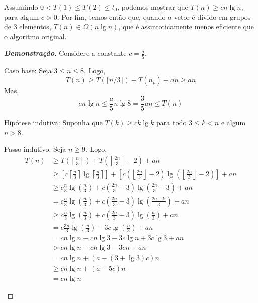 Assumindo $0 < T(1) \leq T(2) \leq t_0$, podemos mostrar que $T(n) \geq c n \lg n$, para algum $c > 0$. Por fim, temos então que, quando o vetor é divido em grupos de 3 elementos, $T(n) \in \Omega(n \lg n)$, que é assintoticamente menos eficiente que o algoritmo original.

\itemdsep{}

\begin{proof}[\textbf{Demonstração}]
    Considere a constante $c = \frac{a}{5}$.

    \begin{ncasos}
        \item[Caso base:] Seja $3 \leq n \leq 8$. Logo,
        \[
            T(n) \geq T(\lceil n / 3 \rceil) + T(n_p) + a n \geq a n
        \]
        Mas,
        \[
            c n \lg n \leq \frac{a}{5} n \lg 8 = \frac{3}{5} a n \leq T(n)
        \]

        \item[Hipótese indutiva:] Suponha que $T(k) \geq c k \lg k$ para todo $3 \leq k < n$ e algum $n > 8$.

        \item[Passo indutivo:] Seja $n \geq 9$. Logo,
        \begin{align*}
            T(n)
            &\geq T\left(\left\lceil \frac{n}{3} \right\rceil\right) + T\left(\left\lfloor\frac{2n}{3}\right\rfloor - 2\right) + a n \\
            &\geq \left[ c \left\lceil \frac{n}{3} \right\rceil \lg\left\lceil \frac{n}{3} \right\rceil \right] + \left[ c \left(\left\lfloor\frac{2n}{3}\right\rfloor - 2\right) \lg\left(\left\lfloor\frac{2n}{3}\right\rfloor - 2 \right) \right] + a n \\
            &\geq c \frac{n}{3} \lg\left(\frac{n}{3}\right) + c \left(\frac{2n}{3} - 3\right) \lg\left(\frac{2n}{3} - 3 \right) + a n \\
            &= c \frac{n}{3} \lg\left(\frac{n}{3}\right) + c \left(\frac{2n}{3} - 3\right) \lg\left(\frac{2n - 9}{3}\right) + a n \\
            &\geq c \frac{n}{3} \lg\left(\frac{n}{3}\right) + c \left(\frac{2n}{3} - 3\right) \lg\left(\frac{n}{3}\right) + a n \\
            &= c \frac{3n}{3} \lg\left(\frac{n}{3}\right) - 3 c \lg\left(\frac{n}{3}\right) + a n \\
            &= c n \lg n  - c n \lg 3 - 3 c \lg n + 3 c \lg 3 + an \\
            &> c n \lg n  - c n \lg 3 - 3 c n + an \\
            &= c n \lg n + (a - (3 + \lg 3) c) n \\
            &\geq c n \lg n + (a - 5 c) n \\
            &= c n \lg n
        \end{align*}
    \end{ncasos}
\end{proof}
